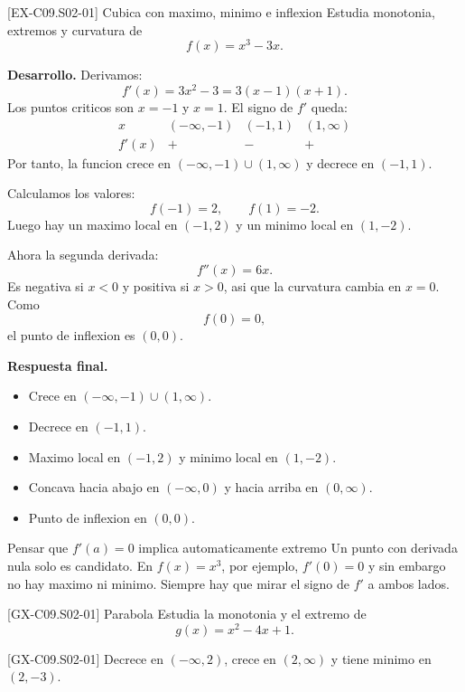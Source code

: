 \begin{solvedexample}{[EX-C09.S02-01] Cubica con maximo, minimo e inflexion}
Estudia monotonia, extremos y curvatura de
\[
f(x)=x^3-3x.
\]

\textbf{Desarrollo.} Derivamos:
\[
f'(x)=3x^2-3=3(x-1)(x+1).
\]
Los puntos criticos son \(x=-1\) y \(x=1\). El signo de \(f'\) queda:
\[
\begin{array}{c|ccc}
x & (-\infty,-1) & (-1,1) & (1,\infty)\\ \hline
f'(x) & + & - & +
\end{array}
\]
Por tanto, la funcion crece en \((-\infty,-1)\cup(1,\infty)\) y decrece en \((-1,1)\).

Calculamos los valores:
\[
f(-1)=2,\qquad f(1)=-2.
\]
Luego hay un maximo local en \((-1,2)\) y un minimo local en \((1,-2)\).

Ahora la segunda derivada:
\[
f''(x)=6x.
\]
Es negativa si \(x<0\) y positiva si \(x>0\), asi que la curvatura cambia en \(x=0\). Como
\[
f(0)=0,
\]
el punto de inflexion es \((0,0)\).

\textbf{Respuesta final.}
\begin{itemize}
  \item Crece en \((-\infty,-1)\cup(1,\infty)\).
  \item Decrece en \((-1,1)\).
  \item Maximo local en \((-1,2)\) y minimo local en \((1,-2)\).
  \item Concava hacia abajo en \((-\infty,0)\) y hacia arriba en \((0,\infty)\).
  \item Punto de inflexion en \((0,0)\).
\end{itemize}
\end{solvedexample}

\begin{commonerror}{Pensar que \(f'(a)=0\) implica automaticamente extremo}
Un punto con derivada nula solo es candidato. En \(f(x)=x^3\), por ejemplo, \(f'(0)=0\) y sin
embargo no hay maximo ni minimo. Siempre hay que mirar el signo de \(f'\) a ambos lados.
\end{commonerror}

\begin{guidedexercise}{[GX-C09.S02-01] Parabola}
Estudia la monotonia y el extremo de
\[
g(x)=x^2-4x+1.
\]
\end{guidedexercise}

\begin{shortanswer}{[GX-C09.S02-01]}
Decrece en \((-\infty,2)\), crece en \((2,\infty)\) y tiene minimo en \((2,-3)\).
\end{shortanswer}

